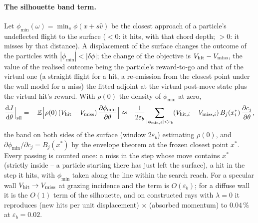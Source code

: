 \documentclass[11pt,a4paper]{article}
\numberwithin{equation}{section}
\begin{document}
\paragraph{The silhouette band term.}
Let $\phi_{\min}(\omega) = \min_s \phi(x + s\hat v)$ be the closest approach of a
particle's undeflected flight to the surface ($<0$: it hits, with that chord depth;
$>0$: it misses by that distance).  A displacement of the surface changes the outcome of
the particles with $|\phi_{\min}| < |\delta\phi|$; the change of the objective is
$V_{\rm hit} - V_{\rm miss}$, the value of the realised outcome being the particle's
reward-to-go and that of the virtual one (a straight flight for a hit, a re-emission from
the closest point under the wall model for a miss) the fitted adjoint at the virtual
post-move state plus the virtual hit's reward.  With $\rho(0)$ the density of
$\phi_{\min}$ at zero,
\[
  \frac{\mathrm dJ}{\mathrm d\theta}\Big|_{\rm sil}
  = -\,\mathbb E\Big[\rho(0)\,(V_{\rm hit}-V_{\rm miss})\,
      \frac{\partial \phi_{\min}}{\partial\theta}\Big]
  \approx -\frac{1}{2\varepsilon_b}\sum_{|\phi_{\min,i}|<\varepsilon_b}
      (V_{{\rm hit},i}-V_{{\rm miss},i})\,B_j(x^*_i)\,\frac{\partial c_j}{\partial\theta},
\]
the band on both sides of the surface (window $2\varepsilon_b$) estimating $\rho(0)$,
and $\partial\phi_{\min}/\partial c_j = B_j(x^*)$ by the envelope theorem at the frozen
closest point $x^*$.  Every passing is counted once: a miss in the step whose move
contains $x^*$ (strictly inside -- a particle starting there has just left the
surface), a hit in the step it hits, with $\phi_{\min}$ taken along the line within
the search reach.  For a specular wall $V_{\rm hit}\to V_{\rm miss}$ at grazing
incidence and the term is $O(\varepsilon_b)$; for a diffuse wall it is the $O(1)$ term of
the silhouette, and on constructed rays with $\lambda = 0$ it reproduces (new hits per
unit displacement) $\times$ (absorbed momentum) to $0.04\,\%$ at $\varepsilon_b = 0.02$.
\end{document}
